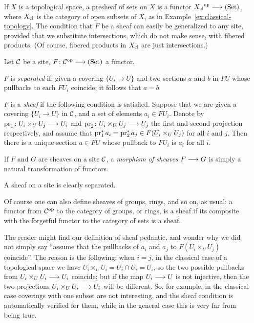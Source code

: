 \begin{2   CONTRAVARIANT FUNCTORS}
\begin{2.3 Sheaves in Grothendieck topologies}
If $X$ is a topological space, a presheaf of sets on $X$ is a functor ${X\cl}\op \arr \catset$, where $X_\mathrm{cl}$ is the category of open subsets of $X$, as in Example~\ref{ex:classical-topology}. The condition that $F$ be a sheaf can easily be generalized to any site, provided that we substitute intersections, which do not make sense, with fibered products. (Of course, fibered products in $X_\mathrm{cl}$ are just intersections.)

\begin{definition}
Let $\mathcal{C}$ be a site, $F \colon \cC\op \arr
\catset$ a functor.

\begin{enumeratei}

\item $F$ is \emph{separated} if, given a covering $\{U_i \to U\}$ and two sections $a$ and $b$ in $F U$ whose pullbacks to each $F U_i$ coincide, it follows that $a = b$.

\item $F$ is a \emph{sheaf} if the following condition is satisfied. Suppose that we are given a covering $\{U_i \to U\}$ in $\mathcal{C}$, and a set of elements $a_i \in F U_i$. Denote by $\pr_1 \colon U_i \times_U U_j \arr U_i$ and $\pr_2 \colon U_i \times_U U_j \arr U_j$ the first and second projection respectively, and assume that $\operatorname{pr}_1^* a_i = \operatorname{pr}_2^* a_j \in F(U_i \times_U U_j)$ for all $i$ and $j$. Then there is a unique section $a \in F U$ whose pullback to $F U_i$ is $a_i$ for all $i$.

If $F$ and $G$ are sheaves on a site $\mathcal{C}$, a \emph{morphism of sheaves} $F \arr G$ is simply a natural transformation of functors.

\end{enumeratei}
\end{definition}

A sheaf on a site is clearly separated.

Of course one can also define sheaves of groups, rings, and so on, as usual: a functor from $\mathcal{C}^{\mathrm{op}}$ to the category of groups, or rings, is a sheaf if its composite with the forgetful functor to the category of sets is a sheaf.

The reader might find our definition of sheaf pedantic, and wonder why we did not simply say ``assume that the pullbacks of $a_i$ and $a_j$ to $F(U_i \times_U U_j)$ coincide''. The reason is the following: when $i = j$, in the classical case of a topological space we have $U_i \times_U U_i = U_i \cap U_i = U_i$, so the two possible pullbacks from $U_i \times_U U_i \arr U_i$ coincide; but if the map $U_i \arr U$ is not injective, then the two projections $U_i \times_U U_i \arr U_i$ will be different. So, for example, in the classical case coverings with one subset are not interesting, and the sheaf condition is automatically verified for them, while in the general case this is very far from being true.



\end{2.3 Sheaves in Grothendieck topologies}
\end{2   CONTRAVARIANT FUNCTORS}
